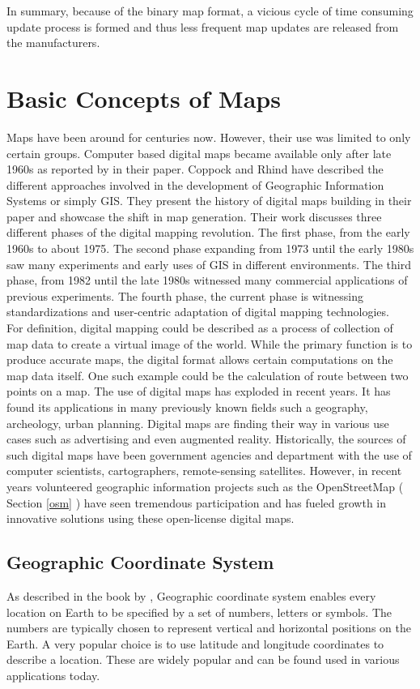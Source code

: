 In summary, because of the binary map format, a vicious cycle of time consuming update process is formed and thus less frequent map updates are released from the manufacturers.


\section{Basic Concepts of Maps}
Maps have been around for centuries now. However, their use was limited to only certain groups. Computer based digital maps became available only after late 1960s as reported by \citet{coppock1991history} in their paper. Coppock and Rhind have described the different approaches involved in the development of Geographic Information Systems or simply GIS. They present the history of digital maps building in their paper and showcase the shift in map generation. Their work discusses three different phases of the digital mapping revolution. The first phase, from the early 1960s to about 1975. The second phase expanding from 1973 until the early 1980s saw many experiments and early uses of GIS in different environments. The third phase, from 1982 until the late 1980s witnessed many commercial applications of previous experiments. The fourth phase, the current phase is witnessing standardizations and user-centric adaptation of digital mapping technologies.\\


For definition, digital mapping could be described as a process of collection of map data to create a virtual image of the world. While the primary function is to produce accurate maps, the digital format allows certain computations on the map data itself. One such example could be the calculation of route between two points on a map. The use of digital maps has exploded in recent years. It has found its applications in many previously known fields such a geography, archeology, urban planning. Digital maps are finding their way in various use cases such as advertising and even augmented reality. Historically, the sources of such digital maps have been government agencies and department with the use of computer scientists, cartographers, remote-sensing satellites. However, in recent years volunteered geographic information projects such as the OpenStreetMap ( Section \ref{osm} ) have seen tremendous participation and has fueled growth in innovative solutions using these open-license digital maps. 
\subsection{Geographic Coordinate System}
As described in the book by \citet{chang2006introduction}, Geographic coordinate system enables every location on Earth to be specified by a set of numbers, letters or symbols. The numbers are typically chosen to represent vertical and horizontal positions on the Earth. A very popular choice is to use latitude and longitude coordinates to describe a location. These are widely popular and can be found used in various applications today.  

